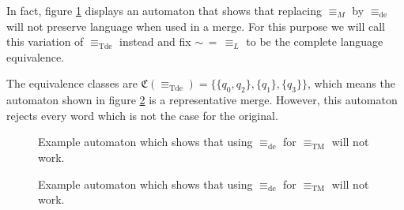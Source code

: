 In fact, figure \ref{fig:tremoore:desim_counterex1} displays an automaton that shows that replacing $\equiv_M$ by $\equiv_\text{de}$ will not preserve language when used in a merge. For this purpose we will call this variation of $\equiv_\text{Tde}$ instead and fix $\sim \,=\, \equiv_L$ to be the complete language equivalence.

The equivalence classes are $\mathfrak{C}(\equiv_\text{Tde}) = \{ \{q_0, q_2\}, \{q_1\}, \{q_3\} \}$, which means the automaton shown in figure \ref{fig:tremoore:desim_counterex2} is a representative merge. However, this automaton rejects every word which is not the case for the original.

\begin{figure}
\centering
{}
\caption{Example automaton which shows that using $\equiv_\text{de}$ for $\equiv_\text{TM}$ will not work.}
\label{fig:tremoore:desim_counterex1}
\end{figure}

\begin{figure}
\centering
{}
\caption{Example automaton which shows that using $\equiv_\text{de}$ for $\equiv_\text{TM}$ will not work.}
\label{fig:tremoore:desim_counterex2}
\end{figure}








